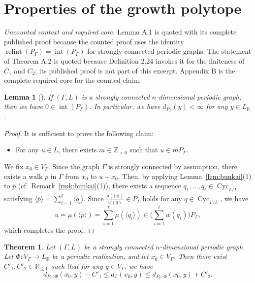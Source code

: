 \documentclass[10pt,a4paper]{amsart}
\theoremstyle{plain}
\newtheorem{thm}[cdrthm]{Theorem}
\newtheorem{lem}[cdrthm]{Lemma}
\theoremstyle{definition}
\theoremstyle{remark}
\begin{document}
\section{Properties of the growth polytope}\label{section:GP}

\noindent\textit{Uncounted context and required core.} Lemma A.1 is quoted with its complete published proof because the counted proof uses the identity $\operatorname{relint}(P_\Gamma)=\operatorname{int}(P_\Gamma)$ for strongly connected periodic graphs. The statement of Theorem A.2 is quoted because Definition 2.24 invokes it for the finiteness of $C_1$ and $C_2$; its published proof is not part of this excerpt. Appendix B is the complete required core for the counted claim.
\begin{lem}[{\cite[Proposition 21]{Fri13}}]\label{lem:int}
If $(\Gamma, L)$ is a strongly connected $n$-dimensional periodic graph, then 
we have $0 \in \operatorname{int}(P _{\Gamma})$. 
In particular, we have $d_{P _{\Gamma}}(y) < \infty$ for any $y \in L_{\mathbb{R}}$. 
\end{lem}
\begin{proof}
It is sufficient to prove the following claim: 
\begin{itemize}
\item For any $u \in L$, there exists $m \in \mathbb{Z}_{>0}$ such that $u \in m P _{\Gamma}$. 
\end{itemize}
We fix $x_0 \in V_{\Gamma}$. 
Since the graph $\Gamma$ is strongly connected by assumption, 
there exists a walk $p$ in $\Gamma$ from $x_0$ to $u + x_0$. 
Then, by applying Lemma~\ref{lem:bunkai}(1) to $\overline{p}$ (cf.\ Remark~\ref{rmk:bunkai}(1)), 
there exists a sequence $q_1, \ldots, q_{\ell} \in \operatorname{Cyc}_{\Gamma /L}$ satisfying
$\langle \overline{p} \rangle = \sum _{i=1} ^{\ell} \langle q_i \rangle$. 
Since $\frac{\mu (\langle q \rangle)}{w(q)} \in P _{\Gamma}$ holds for any $q \in \operatorname{Cyc}_{\Gamma /L}$, 
we have 
\[
u = \mu ( \langle \overline{p} \rangle ) = \sum _{i=1}^{\ell} \mu(\langle q_i \rangle)
\in \biggl( \sum _{i=1} ^{\ell} w(q_i) \biggr) P _{\Gamma}, 
\]
which completes the proof. 
\end{proof}

\setcounter{cdrthm}{1}
\begin{thm}\label{thm:asymp}
Let $(\Gamma , L)$ be a strongly connected $n$-dimensional periodic graph. 
Let $\Phi\colon V_{\Gamma} \to L_{\mathbb{R}}$ be a periodic realization, 
and let $x_0 \in V_{\Gamma}$. Then there exist $C' _1, C' _2 \in \mathbb{R}_{\ge 0}$ such that 
for any $y \in V _{\Gamma}$, we have 
\[
d_{P_{\Gamma}, \Phi} (x_0, y) - C' _1 \le d_{\Gamma}(x_0, y) \le d_{P_{\Gamma}, \Phi} (x_0,y) + C' _2. 
\]
\end{thm}
\end{document}
